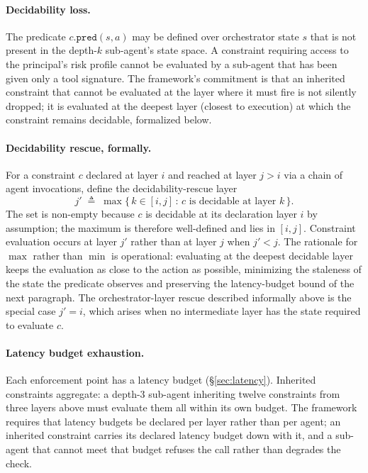 \documentclass[11pt,a4paper]{article}
\theoremstyle{remark}
\begin{document}
\paragraph{Decidability loss.} The predicate $c.\texttt{pred}(s, a)$ may be defined over orchestrator state $s$ that is not present in the depth-$k$ sub-agent's state space. A constraint requiring access to the principal's risk profile cannot be evaluated by a sub-agent that has been given only a tool signature. The framework's commitment is that an inherited constraint that cannot be evaluated at the layer where it must fire is not silently dropped; it is evaluated at the deepest layer (closest to execution) at which the constraint remains decidable, formalized below.

\paragraph{Decidability rescue, formally.} For a constraint $c$ declared at layer $i$ and reached at layer $j > i$ via a chain of agent invocations, define the decidability-rescue layer
\[
    j' \;\triangleq\; \max\bigl\{\, k \in [i, j] \,:\, c \text{ is decidable at layer } k \,\bigr\}.
\]
The set is non-empty because $c$ is decidable at its declaration layer $i$ by assumption; the maximum is therefore well-defined and lies in $[i, j]$. Constraint evaluation occurs at layer $j'$ rather than at layer $j$ when $j' < j$. The rationale for $\max$ rather than $\min$ is operational: evaluating at the deepest decidable layer keeps the evaluation as close to the action as possible, minimizing the staleness of the state the predicate observes and preserving the latency-budget bound of the next paragraph. The orchestrator-layer rescue described informally above is the special case $j' = i$, which arises when no intermediate layer has the state required to evaluate $c$.

\paragraph{Latency budget exhaustion.} Each enforcement point has a latency budget (\S\ref{sec:latency}). Inherited constraints aggregate: a depth-3 sub-agent inheriting twelve constraints from three layers above must evaluate them all within its own budget. The framework requires that latency budgets be declared per layer rather than per agent; an inherited constraint carries its declared latency budget down with it, and a sub-agent that cannot meet that budget refuses the call rather than degrades the check.
\end{document}
